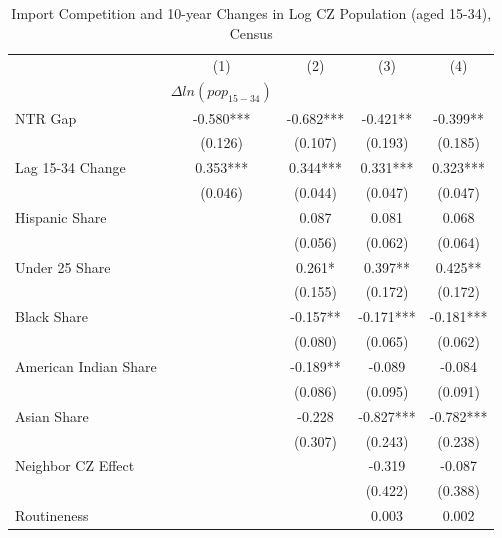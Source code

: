 \documentclass[12pt, final]{CSP}
\begin{document}
\begin{table}[htbp]\centering
\def\sym#1{\ifmmode^{#1}\else\(^{#1}\)\fi}
\caption{Import Competition and 10-year Changes in Log CZ Population (aged 15-34), Census}
\begin{tabular}{l*{4}{c}}
\hline
\hline 
\toprule
                    &\multicolumn{1}{c}{(1)}&\multicolumn{1}{c}{(2)}&\multicolumn{1}{c}{(3)}&\multicolumn{1}{c}{(4)}\\
                    &\multicolumn{1}{c}{$\Delta ln(pop_{15-34})$}&\multicolumn{1}{c}{}&\multicolumn{1}{c}{}&\multicolumn{1}{c}{}\\
\hline
\midrule
NTR Gap             &   -0.580***&   -0.682***&   -0.421** &   -0.399** \\
                    &  (0.126)   &  (0.107)   &  (0.193)   &  (0.185)   \\
\addlinespace
Lag 15-34 Change    &    0.353***&    0.344***&    0.331***&    0.323***\\
                    &  (0.046)   &  (0.044)   &  (0.047)   &  (0.047)   \\
\addlinespace
Hispanic Share      &            &    0.087   &    0.081   &    0.068   \\
                    &            &  (0.056)   &  (0.062)   &  (0.064)   \\
\addlinespace
Under 25 Share      &            &    0.261*  &    0.397** &    0.425** \\
                    &            &  (0.155)   &  (0.172)   &  (0.172)   \\
\addlinespace
Black Share         &            &   -0.157** &   -0.171***&   -0.181***\\
                    &            &  (0.080)   &  (0.065)   &  (0.062)   \\
\addlinespace
American Indian Share&            &   -0.189** &   -0.089   &   -0.084   \\
                    &            &  (0.086)   &  (0.095)   &  (0.091)   \\
\addlinespace
Asian Share         &            &   -0.228   &   -0.827***&   -0.782***\\
                    &            &  (0.307)   &  (0.243)   &  (0.238)   \\
\addlinespace
Neighbor CZ Effect  &            &            &   -0.319   &   -0.087   \\
                    &            &            &  (0.422)   &  (0.388)   \\
\addlinespace
Routineness         &            &            &    0.003   &    0.002   \\

\end{tabular}
\end{table}
\end{document}
